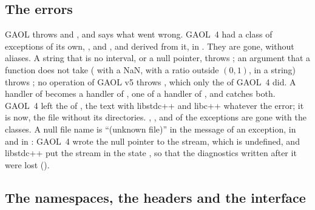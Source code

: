 \subsection{The errors}
\label{sec:changes-errors}
%

GAOL throws  and , and
 says what went wrong.\newinvfive{} GAOL~4 had a class of
exceptions of its own, , and
,  and
 derived from it, in
. They are gone, without aliases. A string
that is no interval, or a null pointer, throws ;
an argument that a function does not take ( with a
NaN,  with a ratio outside $(0, 1)$, 
in a string) throws ; no operation of GAOL v5 throws
, which only the  of GAOL~4
did. A handler of  becomes a handler of
, one of  a
handler of , and  catches
both. GAOL~4 left the  of , the text
 with libstdc++ and libc++ whatever the error; it is
 now, the file without its directories.
, ,  and  of
the exceptions are gone with the classes. A null file name is ``(unknown
file)'' in the message of an exception, in  and in
: GAOL~4 wrote the null pointer to the stream, which is
undefined, and libstdc++ put the stream in the state , so that the
diagnostics written after it were lost ().

\subsection{The namespaces, the headers and the interface}
\label{sec:changes-interface}
%
%

